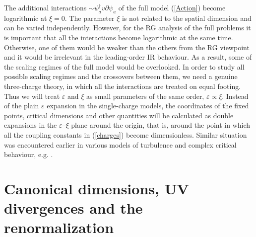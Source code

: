 \documentclass[12pt]{article}
\begin{document}
The additional interactions $\sim \psi^{\dag}_{a} v\partial \psi_{a} $
of the full model (\ref{Action})
become logarithmic at $\xi=0$. The parameter $\xi$ is not
related to the spatial dimension and can be varied independently. However,
for the RG analysis of the full problems it is important that
all the interactions become logarithmic at the same time. Otherwise, one
of them would be weaker than the others from the RG viewpoint and it would
be irrelevant in the leading-order IR behaviour. As a result, some of the
scaling regimes of the full model would be overlooked.
In order to study all possible scaling regimes and the crossovers between
them, we need a genuine three-charge theory, in which all the interactions
are treated on equal footing. Thus we will treat $\varepsilon$ and $\xi$ as
small parameters of the same order, $\varepsilon \propto \xi$.
Instead of the plain $\varepsilon$ expansion in the single-charge models,
the coordinates of the fixed points, critical dimensions
and other quantities will be calculated as double expansions in the
$\varepsilon$--$\xi$ plane around the origin, that is, around the point in which
all the coupling constants in (\ref{charges}) become dimensionless.
Similar situation was encountered earlier in various models of turbulence
and complex critical behaviour, e.g. \cite{AHH,Alexa,AIK,AIM,Sak}.


\section{Canonical dimensions, UV divergences and the renormalization}
\label{sec:Reno}
\end{document}
